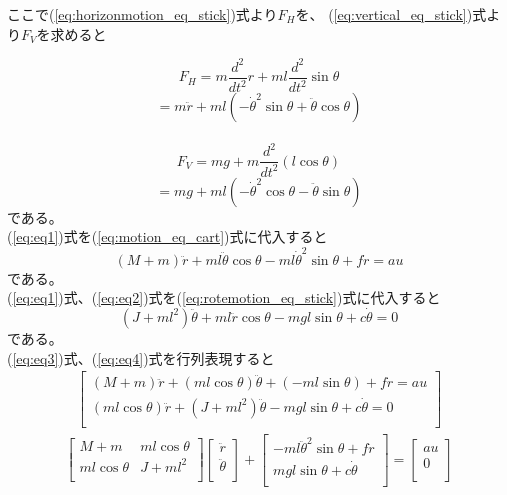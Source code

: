 	ここで(\ref{eq:horizonmotion_eq_stick})式より$F_{H}$を、
	(\ref{eq:vertical_eq_stick})式より$F_{V}$を求めると
	
	\[F_{H} = m\frac{d^{2}}{dt^{2}}r + ml\frac{d^{2}}{dt^{2}}\sin{\theta}\]
	\begin{equation}
		= m\ddot{r}+ml(-\dot{\theta}^{2}\sin{\theta}+\ddot{\theta}\cos{\theta})
		\label{eq:eq1}
	\end{equation}
	\\
	\[F_{V} = mg + m\frac{d^{2}}{dt^{2}}(l\cos{\theta})\]
	\begin{equation}
		= mg + ml(-\dot{\theta}^{2}\cos{\theta}-\ddot{\theta}\sin{\theta})
		\label{eq:eq2}
	\end{equation}
	である。\\
	(\ref{eq:eq1})式を(\ref{eq:motion_eq_cart})式に代入すると\\
	\begin{equation}
		(M+m)\ddot{r} + ml\ddot{\theta}\cos{\theta}-ml\dot{\theta}^{2}\sin{\theta}+f\dot{r}=au
		\label{eq:eq3}
	\end{equation}
	である。\\
	(\ref{eq:eq1})式、(\ref{eq:eq2})式を(\ref{eq:rotemotion_eq_stick})式に代入すると\\
	\begin{equation}
		(J + ml^{2})\ddot{\theta} + ml\ddot{r}\cos{\theta} - mgl\sin{\theta} + c\dot{\theta} = 0
		\label{eq:eq4}
	\end{equation}
	である。\\
	(\ref{eq:eq3})式、(\ref{eq:eq4})式を行列表現すると\\
	\begin{eqnarray}
		\left[
		\begin{array}{ccc}
			(M + m)\ddot{r} + (ml\cos{\theta})\ddot{\theta} + (-ml\sin{\theta}) + f\dot{r} = au \\
			(ml\cos{\theta})\ddot{r} + (J + ml^{2})\ddot{\theta} -mgl\sin{\theta} + c\dot{\theta} = 0\\
		\end{array}
		\right]
	\end{eqnarray}
	\begin{eqnarray}
		\left[
		\begin{array}{ccc}
			M + m & ml\cos{\theta} \\
			ml\cos{\theta} & J + ml^{2}\\
		\end{array}
		\right]
		\left[
		\begin{array}{ccc}
			\ddot{r} \\
			\ddot{\theta}\\
		\end{array}
		\right] +
		\left[
		\begin{array}{ccc}
			-ml\ddot{\theta}^{2}\sin{\theta} + f\dot{r}\\
			mgl\sin{\theta} + c\dot{\theta}\\
		\end{array}
		\right] = 
		\left[
		\begin{array}{ccc}
			au\\
			0\\
		\end{array}
		\right]
	\end{eqnarray}
